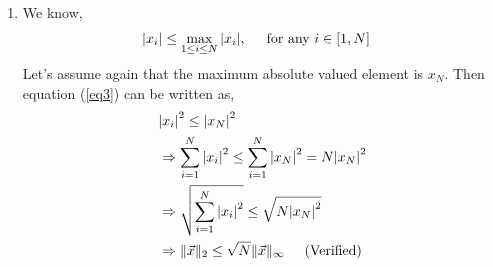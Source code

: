 \documentclass[11pt]{article} %
\begin{document}
\begin{enumerate}
\begin{enumerate}[\textbf{(\alph*)}]
\item We know,
\begin{equation}
\begin{split}
&\vert x_i \vert \leq \max\limits_{1\leq i \leq N} \vert x_i\vert, \hspace{0.5cm} \text{for any $i \in [1, N]$}
\end{split}
\label{eq3}
\end{equation}
Let's assume again that the maximum absolute valued element is $x_N$. Then equation (\ref{eq3}) can be written as,
\begin{equation*}
\begin{split}
&{\vert x_i \vert}^2 \leq {\vert x_N\vert}^2\\
&\Rightarrow \sum\limits_{i=1}^N {\vert x_i \vert}^2 \leq \sum\limits_{i=1}^N {\vert x_N\vert}^2 = N{\vert x_N\vert}^2\\
&\Rightarrow \sqrt{\sum\limits_{i=1}^N{\vert x_i\vert}^2} \leq \sqrt{N{\vert x_N\vert}^2}\\
&\Rightarrow \|\Vec x\|_2 \leq \sqrt{N}\|\Vec x\|_{\infty} \hspace{0.5cm} \text{(Verified)}
\end{split}
\end{equation*}
\end{enumerate}


\end{enumerate}
\end{document}
